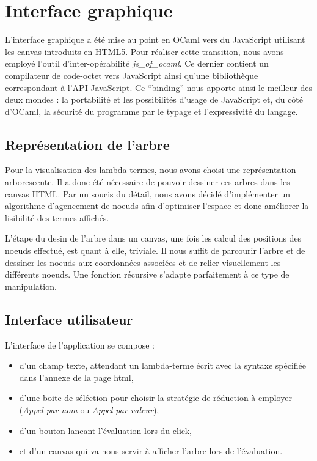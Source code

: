 \documentclass[a4paper, 11pt]{report}
\begin{document}
\chapter{Interface graphique}

L'interface graphique a été mise au point en OCaml vers du JavaScript
utilisant les canvas introduits en HTML5. Pour réaliser cette
transition, nous avons employé l'outil d'inter-opérabilité
\emph{js_of_ocaml}. Ce dernier contient un compilateur de code-octet
vers JavaScript ainsi qu'une bibliothèque correspondant à l'API
JavaScript. Ce ``binding'' nous apporte ainsi le meilleur des deux
mondes : la portabilité et les possibilités d'usage de JavaScript et,
du côté d'OCaml, la sécurité du programme par le typage et
l'expressivité du langage.

\section{Représentation de l'arbre}

Pour la visualisation des lambda-termes, nous avons choisi une
représentation arborescente. Il a donc été nécessaire de pouvoir
dessiner ces arbres dans les canvas HTML. Par un soucis du détail,
nous avons décidé d'implémenter un algorithme d'agencement de noeuds
afin d'optimiser l'espace et donc améliorer la lisibilité des termes
affichés. 

L'étape du desin de l'arbre dans un canvas, une fois les calcul des
positions des noeuds effectué, est quant à elle, triviale. Il nous
suffit de parcourir l'arbre et de dessiner les noeuds aux coordonnées
associées et de relier visuellement les différents noeuds. Une
fonction récursive s'adapte parfaitement à ce type de manipulation.

\section{Interface utilisateur}

L'interface de l'application se compose : 
\begin{itemize}

\item d'un champ texte, attendant un lambda-terme écrit avec la
  syntaxe spécifiée dans l'annexe de la page html,

\item d'une boite de séléction pour choisir la stratégie de réduction
  à employer (\emph{Appel par nom} ou \emph{Appel par valeur}),

\item d'un bouton lancant l'évaluation lors du click,

\item et d'un canvas qui va nous servir à afficher l'arbre lors de
  l'évaluation.
\end{itemize}
\end{document}
